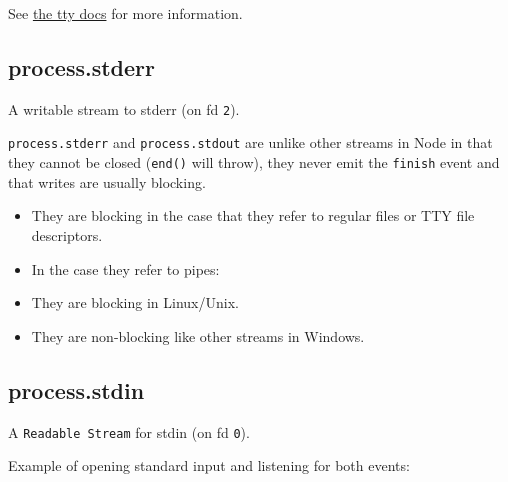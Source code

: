 See \href{tty.html\#tty_tty}{the tty docs} for more information.

\subsection{process.stderr}\label{process.stderr}

A writable stream to stderr (on fd \texttt{2}).

\texttt{process.stderr} and \texttt{process.stdout} are unlike other
streams in Node in that they cannot be closed (\texttt{end()} will
throw), they never emit the \texttt{finish} event and that writes are
usually blocking.

\begin{itemize}
\itemsep1pt\parskip0pt
\item
  They are blocking in the case that they refer to regular files or TTY
  file descriptors.
\item
  In the case they refer to pipes:
\item
  They are blocking in Linux/Unix.
\item
  They are non-blocking like other streams in Windows.
\end{itemize}

\subsection{process.stdin}\label{process.stdin}

A \texttt{Readable\ Stream} for stdin (on fd \texttt{0}).

Example of opening standard input and listening for both events:

\begin{Shaded}
\begin{Highlighting}[]
\NormalTok{(}\NormalTok{);}

\NormalTok{(}\NormalTok{, }\NormalTok{() \{}
   \NormalTok{();}
   \NormalTok{) \{}
    \NormalTok{(} 
  \NormalTok{\}}
\NormalTok{\});}

\NormalTok{(}\NormalTok{, }\NormalTok{() \{}
  \NormalTok{(}\NormalTok{);}
\NormalTok{\});}
\end{Highlighting}
\end{Shaded}


